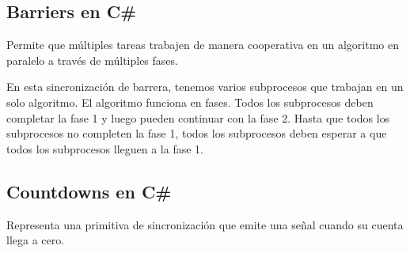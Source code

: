 \documentclass[10pt]{article} %
\begin{document}
\subsection{Barriers en C\#}

Permite que múltiples tareas trabajen de manera cooperativa en un algoritmo en paralelo a través de múltiples fases.

En esta sincronización de barrera, tenemos varios subprocesos que trabajan en un solo algoritmo. El algoritmo funciona en fases. Todos los subprocesos deben completar la fase 1 y luego pueden continuar con la fase 2. Hasta que todos los subprocesos no completen la fase 1, todos los subprocesos deben esperar a que todos los subprocesos lleguen a la fase 1.

\subsection{Countdowns en C\#}

Representa una primitiva de sincronización que emite una señal cuando su cuenta llega a cero.
\end{document}
